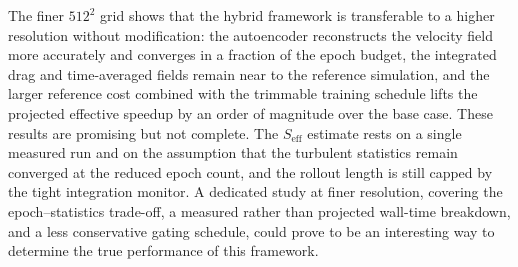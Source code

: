 The finer $512^2$ grid shows that the hybrid framework is transferable to a higher resolution without modification: the autoencoder reconstructs the velocity field more accurately and converges in a fraction of the epoch budget, the integrated drag and time-averaged fields remain near to the reference simulation, and the larger reference cost combined with the trimmable training schedule lifts the projected effective speedup by an order of magnitude over the base case. These results are promising but not complete. The $S_\text{eff}$ estimate rests on a single measured run and on the assumption that the turbulent statistics remain converged at the reduced epoch count, and the rollout length is still capped by the tight integration monitor. A dedicated study at finer resolution, covering the epoch--statistics trade-off, a measured rather than projected wall-time breakdown, and a less conservative gating schedule, could prove to be an interesting way to determine the true performance of this framework. 